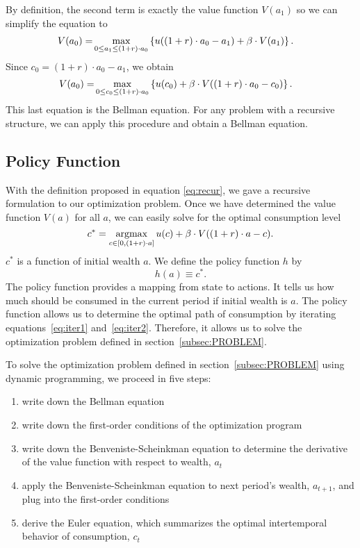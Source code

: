 \documentclass[letterpaper,12pt,leqno]{article}
\begin{document}
By definition, the second term is exactly the value function $V(a_{1})$ so we can simplify the equation to
\begin{align*}
V(a_0)=&\max_{0\leq a_{1}\leq (1+r)\cdot a_0}\bc{u((1+r)\cdot a_0-a_1)+\b \cdot  V(a_1)}.
\end{align*}
Since $c_{0}=(1+r)\cdot a_0-a_1$, we obtain
\begin{align*}
V(a_0)=&\max_{0\leq c_{0}\leq (1+r)\cdot a_0}\bc{u(c_0)+\b \cdot  V((1+r)\cdot a_0-c_0)}.
\end{align*}
This last equation is the Bellman equation. For any problem with a recursive structure, we can apply this procedure and obtain a Bellman equation.

\subsection{Policy Function}

With the definition proposed in equation \eqref{eq:recur}, we gave a recursive formulation to our optimization problem. Once we have determined the value function $V(a)$ for all $a$, we can easily solve for the optimal consumption level
\begin{equation*}
c^*=\operatorname*{argmax}_{c\in[0,(1+r)\cdot a]}u(c)+\beta  \cdot V((1+r)\cdot a-c).
\end{equation*}
$c^*$ is a function of initial wealth $a$. We define the policy function $h$ by
\begin{equation*}
h(a)\equiv c^*.
\end{equation*}
The policy function provides a mapping from state to actions. It tells us how much should be consumed in the current period if initial wealth is $a$. The policy function allows us to  determine the optimal path of consumption by iterating equations~\eqref{eq:iter1} and~\eqref{eq:iter2}.  Therefore, it allows us to solve  the optimization problem defined in section~\ref{subsec:PROBLEM}.  

To solve the optimization problem defined in section~\ref{subsec:PROBLEM} using dynamic programming, we proceed in five steps:
\begin{enumerate}
 \item write down the Bellman equation
 \item write down the first-order conditions of the optimization program
 \item write down the Benveniste-Scheinkman equation to determine the derivative of the value function with respect
to wealth, $a_{t}$
  \item apply the Benveniste-Scheinkman equation to next period's wealth, $a_{t+1}$, and plug into the first-order
conditions
 \item derive the Euler equation, which summarizes the optimal intertemporal behavior of consumption, $c_{t}$
\end{enumerate}
\end{document}
